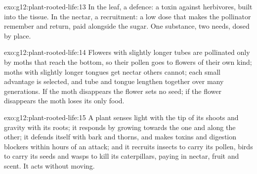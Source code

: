 \begin{solution}{exo:g12:plant-rooted-life:13}
In the leaf, a defence: a toxin against herbivores, built into the
tissue. In the nectar, a recruitment: a low dose that makes the
pollinator remember and return, paid alongside the sugar. One
substance, two needs, dosed by place.
\end{solution}

\begin{solution}{exo:g12:plant-rooted-life:14}
Flowers with slightly longer tubes are pollinated only by moths that
reach the bottom, so their pollen goes to flowers of their own kind;
moths with slightly longer tongues get nectar others cannot; each
small advantage is selected, and tube and tongue lengthen together
over many generations. If the moth disappears the flower sets no
seed; if the flower disappears the moth loses its only food.
\end{solution}

\begin{solution}{exo:g12:plant-rooted-life:15}
A plant senses light with the tip of its shoots and gravity with its
roots; it responds by growing towards the one and along the other; it
defends itself with bark and thorns, and makes toxins and digestion
blockers within hours of an attack; and it recruits insects to carry
its pollen, birds to carry its seeds and wasps to kill its
caterpillars, paying in nectar, fruit and scent. It acts without
moving.
\end{solution}

